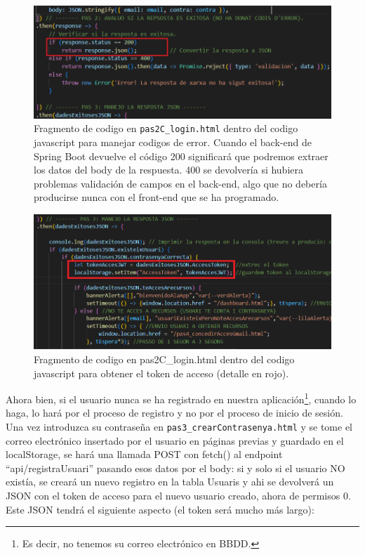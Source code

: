 \documentclass[a4paper,12pt]{report}
\begin{document}
	
	\setlength{\belowcaptionskip}{3pt}
	\FloatBarrier
	\begin{figure}[H]
		\centering
		\caption{Fragmento de codigo en \texttt{pas2C\_login.html} dentro del codigo javascript para manejar codigos de error. Cuando el back-end de Spring Boot devuelve el código 200 significará que podremos extraer los datos del body de la respuesta. 400 se devolvería si hubiera problemas validación de campos en el back-end,  algo que no debería producirse nunca con el front-end que se ha programado.}
		\includegraphics[width=1\textwidth]{img/FetchCodisResponseFRONT.png}
		
		\label{fig:FetchCodisResponseFRONT} 
	\end{figure}
	\FloatBarrier
	
	\setlength{\belowcaptionskip}{3pt}
	\FloatBarrier
	\begin{figure}[H]
		\centering
		\caption{Fragmento de codigo en pas2C\_login.html dentro del codigo javascript para obtener el token de acceso (detalle en rojo).}
		\includegraphics[width=1\textwidth]{img/jwtFetchLoginFront.png}
		
		\label{fig:figuraLoginFetch} 
	\end{figure}
	\FloatBarrier
	
	
	
	Ahora bien, si el usuario nunca se ha registrado en nuestra aplicación\footnote{Es decir, no tenemos su correo electrónico en BBDD.}, cuando lo haga, lo hará por el proceso de registro y no por el proceso de inicio de sesión. Una vez introduzca su contraseña en \texttt{pas3\_crearContrasenya.html} y se tome el correo electrónico insertado por el usuario en páginas previas y guardado en el localStorage, se hará una llamada POST con fetch() al endpoint ``api/registraUsuari'' pasando esos datos por el body: si y solo si el usuario NO existía, se creará un nuevo registro en la tabla Usuaris y ahi se devolverá un JSON con el token de acceso para el nuevo usuario creado, ahora de permisos 0. Este JSON tendrá el siguiente aspecto (el token será mucho más largo):
	
\end{document}

